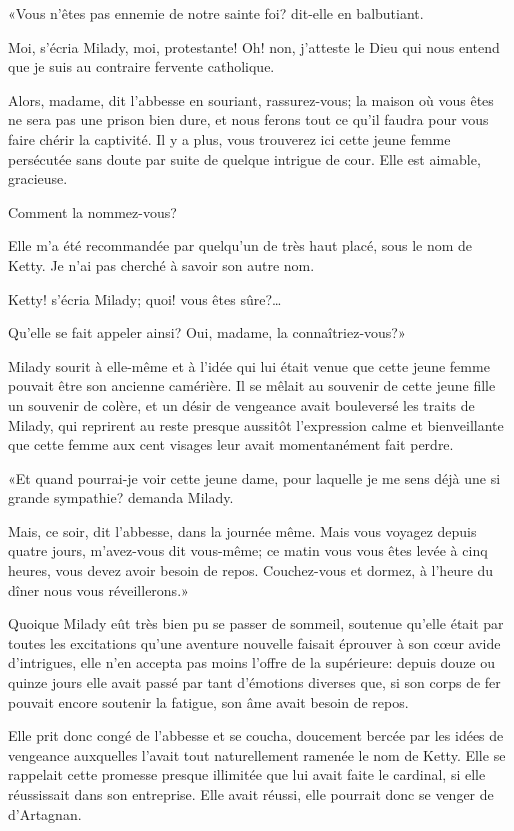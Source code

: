 «Vous n'êtes pas ennemie de notre sainte foi? dit-elle en balbutiant. 

\speak  Moi, s'écria Milady, moi, protestante! Oh! non, j'atteste le Dieu qui nous entend que je suis au contraire fervente catholique. 

\speak  Alors, madame, dit l'abbesse en souriant, rassurez-vous; la maison où vous êtes ne sera pas une prison bien dure, et nous ferons tout ce qu'il faudra pour vous faire chérir la captivité. Il y a plus, vous trouverez ici cette jeune femme persécutée sans doute par suite de quelque intrigue de cour. Elle est aimable, gracieuse. 

\speak  Comment la nommez-vous? 

\speak  Elle m'a été recommandée par quelqu'un de très haut placé, sous le nom de Ketty. Je n'ai pas cherché à savoir son autre nom. 

\speak  Ketty! s'écria Milady; quoi! vous êtes sûre?\dots 

\speak  Qu'elle se fait appeler ainsi? Oui, madame, la connaîtriez-vous?» 

Milady sourit à elle-même et à l'idée qui lui était venue que cette jeune femme pouvait être son ancienne camérière. Il se mêlait au souvenir de cette jeune fille un souvenir de colère, et un désir de vengeance avait bouleversé les traits de Milady, qui reprirent au reste presque aussitôt l'expression calme et bienveillante que cette femme aux cent visages leur avait momentanément fait perdre. 

«Et quand pourrai-je voir cette jeune dame, pour laquelle je me sens déjà une si grande sympathie? demanda Milady. 

\speak  Mais, ce soir, dit l'abbesse, dans la journée même. Mais vous voyagez depuis quatre jours, m'avez-vous dit vous-même; ce matin vous vous êtes levée à cinq heures, vous devez avoir besoin de repos. Couchez-vous et dormez, à l'heure du dîner nous vous réveillerons.» 

Quoique Milady eût très bien pu se passer de sommeil, soutenue qu'elle était par toutes les excitations qu'une aventure nouvelle faisait éprouver à son cœur avide d'intrigues, elle n'en accepta pas moins l'offre de la supérieure: depuis douze ou quinze jours elle avait passé par tant d'émotions diverses que, si son corps de fer pouvait encore soutenir la fatigue, son âme avait besoin de repos. 

Elle prit donc congé de l'abbesse et se coucha, doucement bercée par les idées de vengeance auxquelles l'avait tout naturellement ramenée le nom de Ketty. Elle se rappelait cette promesse presque illimitée que lui avait faite le cardinal, si elle réussissait dans son entreprise. Elle avait réussi, elle pourrait donc se venger de d'Artagnan. 

